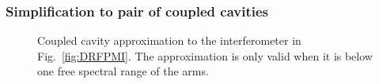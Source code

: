 
\subsubsection{Simplification to pair of coupled cavities}
\label{sec:coupled_cavity_approximation}

\begin{figure}
	\centering
	\caption{Coupled cavity approximation to the interferometer in Fig.~\ref{fig:DRFPMI}. The approximation is only valid when it is below one free spectral range of the arms.}
	\label{fig:coupled_cavity_approx}
\end{figure}


